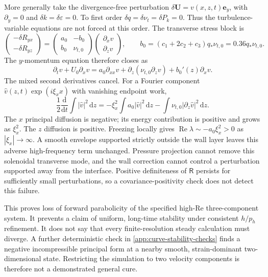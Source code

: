 \documentclass[11pt,a4paper]{article}
\numberwithin{equation}{section}
\newcommand{\dd}{\mathrm{d}}
\newcommand{\eps}{\varepsilon}
\newcommand{\qs}{q_*}
\newcommand{\R}{\mathsf{R}}
\begin{document}
More generally take the divergence-free perturbation
$\delta\bm U=v(x,z,t)\bm e_y$, with $\partial_y=0$ and
$\delta k=\delta\eps=0$. To first order
$\delta q=\delta\nu_t=\delta P_k=0$. Thus the turbulence-variable
equations are not forced at this order. The transverse stress block is
\begin{equation}
 \begin{pmatrix}-\delta R_{yx}\\-\delta R_{yz}\end{pmatrix}
 =\begin{pmatrix}a_0&-b_0\\b_0&\nu_{t,0}\end{pmatrix}
   \begin{pmatrix}\partial_xv\\\partial_zv\end{pmatrix},
 \qquad b_0=(c_1+2c_2+c_3)\qs\nu_{t,0}
           =0.36\qs\nu_{t,0}.
 \label{eq:stability-transverse-block}
\end{equation}
The $y$-momentum equation therefore closes as
\begin{equation}
 \partial_tv+U_0\partial_xv
 =a_0\partial_{xx}v
   +\partial_z(\nu_{t,0}\partial_zv)
   +b_0'(z)\partial_xv.
 \label{eq:stability-transverse-pde}
\end{equation}
The mixed second derivatives cancel. For a Fourier component
$\widehat v(z,t)\exp(i\xi_xx)$ with vanishing endpoint work,
\begin{equation}
 \frac12\frac{\dd}{\dd t}\int|\widehat v|^2\,\dd z
 =-\xi_x^2\int a_0|\widehat v|^2\,\dd z
  -\int\nu_{t,0}|\partial_z\widehat v|^2\,\dd z.
 \label{eq:stability-transverse-energy}
\end{equation}
The $x$ principal diffusion is negative; its energy contribution is
positive and grows as $\xi_x^2$. The $z$ diffusion is positive.
Freezing locally gives
$\operatorname{Re}\lambda\sim -a_0\xi_x^2>0$ as
$|\xi_x|\to\infty$. A smooth envelope supported strictly outside the
wall layer leaves this adverse high-frequency term unchanged.
Pressure projection cannot remove this solenoidal transverse mode,
and the wall correction cannot control a perturbation supported away
from the interface. Positive definiteness of $\R$ persists for
sufficiently small perturbations, so a covariance-positivity check
does not detect this failure.

This proves loss of forward parabolicity of the specified high-Re
three-component system. It prevents a claim of uniform, long-time
stability under consistent $h/p_h$ refinement. It does not say that
every finite-resolution steady calculation must diverge. A further
deterministic check in \cref{app:curve-stability-checks} finds a
negative incompressible principal form at a nearby smooth,
strain-dominant two-dimensional state. Restricting the simulation to
two velocity components is therefore not a demonstrated general cure.
\end{document}
